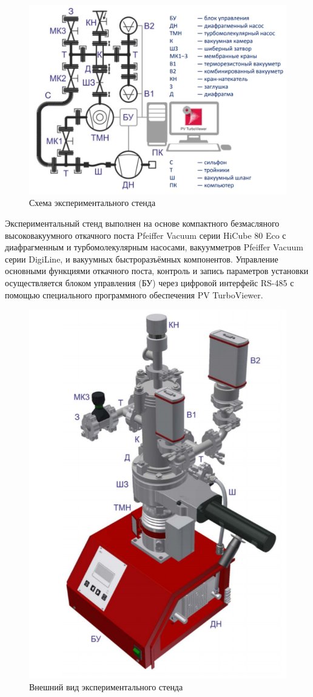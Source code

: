 \documentclass[a4paper, 12pt]{article} %
\begin{document}
\begin{figure}[h]
    \centering
    \includegraphics[width = 13 cm]{Схема}
    \caption{Схема экспериментального стенда}
    \label{fig:vac}
\end{figure}

Экспериментальный стенд выполнен на основе компактного безмасляного высоковакуумного откачного поста Pfeiffer Vacuum серии HiCube 80 Eco с диафрагменным и турбомолекулярным насосами, вакуумметров Pfeiffer Vacuum серии DigiLine, и вакуумных быстроразъёмных компонентов. Управление основными функциями откачного
поста, контроль и запись параметров установки осуществляется блоком управления (БУ) через цифровой интерфейс RS-485 с помощью специального программного обеспечения PV TurboViewer.

\begin{figure}[h]
    \centering
    \includegraphics[width = 10.5 cm]{Внешний вид}
    \caption{Внешний вид экспериментального стенда}
    \label{fig:vac}
\end{figure}
\end{document}
